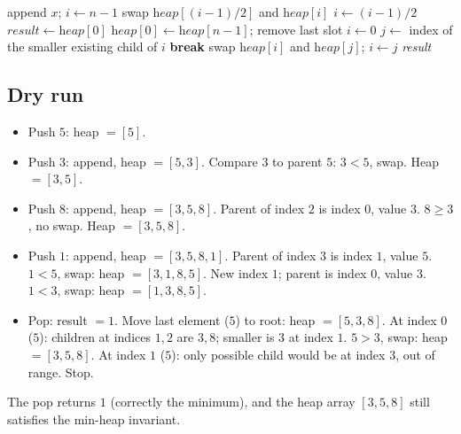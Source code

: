 \begin{algorithm}[H]
\caption{Min Heap: Push and Pop}
\begin{algorithmic}[1]
  \State append $x$; $i \gets n - 1$
    \State swap $\textit{heap}[(i-1)/2]$ and $\textit{heap}[i]$
    \State $i \gets (i-1)/2$
  \EndWhile
\EndProcedure
{}
  \State $\textit{result} \gets \textit{heap}[0]$
  \State $\textit{heap}[0] \gets \textit{heap}[n-1]$; remove last slot
  \State $i \gets 0$
    \State $j \gets$ index of the smaller existing child of $i$
     \textbf{break} \EndIf
    \State swap $\textit{heap}[i]$ and $\textit{heap}[j]$; $i \gets j$
  \EndWhile
  \State \Return \textit{result}
\EndProcedure
\end{algorithmic}
\end{algorithm}

\subsection*{Dry run}


\begin{itemize}
  \item Push $5$: heap $=[5]$.
  \item Push $3$: append, heap $=[5,3]$. Compare $3$ to parent $5$:
        $3<5$, swap. Heap $=[3,5]$.
  \item Push $8$: append, heap $=[3,5,8]$. Parent of index $2$ is index
        $0$, value $3$. $8 \ge 3$, no swap. Heap $=[3,5,8]$.
  \item Push $1$: append, heap $=[3,5,8,1]$. Parent of index $3$ is index
        $1$, value $5$. $1<5$, swap: heap $=[3,1,8,5]$. New index $1$;
        parent is index $0$, value $3$. $1<3$, swap: heap $=[1,3,8,5]$.
  \item Pop: result $=1$. Move last element ($5$) to root: heap
        $=[5,3,8]$. At index $0$ ($5$): children at indices $1,2$ are
        $3,8$; smaller is $3$ at index $1$. $5>3$, swap: heap
        $=[3,5,8]$. At index $1$ ($5$): only possible child would be at
        index $3$, out of range. Stop.
\end{itemize}

The pop returns $1$ (correctly the minimum), and the heap array
$[3,5,8]$ still satisfies the min-heap invariant.

